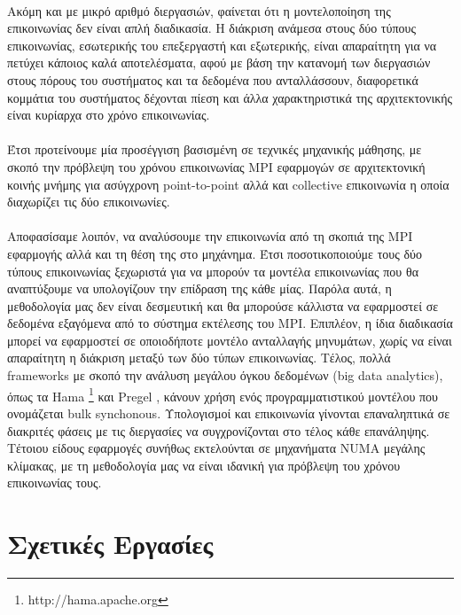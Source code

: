 \paragraph{}
 Ακόμη και με μικρό αριθμό διεργασιών, φαίνεται ότι η μοντελοποίηση της επικοινωνίας δεν είναι απλή διαδικασία. Η διάκριση ανάμεσα στους δύο τύπους επικοινωνίας, εσωτερικής του επεξεργαστή και εξωτερικής,  είναι απαραίτητη για να πετύχει κάποιος καλά αποτελέσματα, αφού με βάση την κατανομή των διεργασιών στους πόρους του συστήματος και τα δεδομένα που ανταλλάσσουν, διαφορετικά κομμάτια του συστήματος δέχονται πίεση και άλλα χαρακτηριστικά της αρχιτεκτονικής είναι κυρίαρχα στο χρόνο επικοινωνίας.
\paragraph{}
Έτσι προτείνουμε μία προσέγγιση βασισμένη σε τεχνικές μηχανικής μάθησης, με σκοπό την πρόβλεψη του χρόνου επικοινωνίας MPI εφαρμογών σε αρχιτεκτονική κοινής μνήμης για ασύγχρονη point-to-point αλλά και collective επικοινωνία η οποία διαχωρίζει τις δύο επικοινωνίες.
\paragraph{}
Αποφασίσαμε λοιπόν, να αναλύσουμε την επικοινωνία από τη σκοπιά της MPI εφαρμογής αλλά και τη θέση της στο μηχάνημα. Έτσι ποσοτικοποιούμε τους δύο τύπους επικοινωνίας ξεχωριστά για να μπορούν τα μοντέλα επικοινωνίας που θα αναπτύξουμε να υπολογίζουν την επίδραση της κάθε μίας. Παρόλα αυτά, η μεθοδολογία μας δεν είναι δεσμευτική και θα μπορούσε κάλλιστα να εφαρμοστεί σε δεδομένα εξαγόμενα από το σύστημα εκτέλεσης του MPI. Επιπλέον, η ίδια διαδικασία μπορεί να εφαρμοστεί σε οποιοδήποτε μοντέλο ανταλλαγής μηνυμάτων, χωρίς να είναι απαραίτητη η διάκριση μεταξύ των δύο τύπων επικοινωνίας. Τέλος, πολλά frameworks με σκοπό την ανάλυση μεγάλου όγκου δεδομένων (big data analytics), όπως τα Hama \footnote{http://hama.apache.org} και Pregel \cite{PREGEL}, κάνουν χρήση ενός προγραμματιστικού μοντέλου που ονομάζεται bulk synchonous. Υπολογισμοί και επικοινωνία γίνονται επαναληπτικά σε διακριτές φάσεις με τις διεργασίες να συγχρονίζονται στο τέλος κάθε επανάληψης. Τέτοιου είδους εφαρμογές συνήθως εκτελούνται σε μηχανήματα NUMA μεγάλης κλίμακας, με τη μεθοδολογία μας να είναι ιδανική για πρόβλεψη του χρόνου επικοινωνίας τους. 

\section{Σχετικές Εργασίες}
